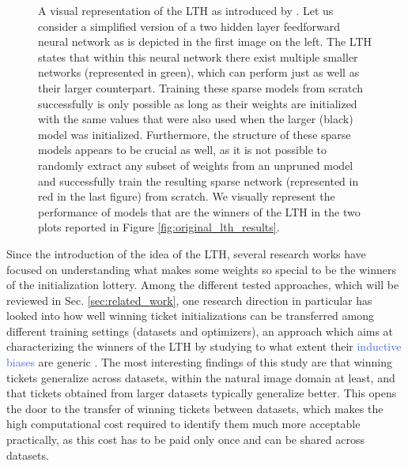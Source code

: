 \begin{figure}[!htb]
\endminipage
\caption{A visual representation of the LTH as introduced by \citet{frankle2018lottery}. Let us consider a simplified version of a two hidden layer feedforward neural network as is depicted in the first image on the left. The LTH states that within this neural network there exist multiple smaller networks (represented in green), which can perform just as well as their larger counterpart. Training these sparse models from scratch successfully is only possible as long as their weights are initialized with the same values that were also used when the larger (black) model was initialized. Furthermore, the structure of these sparse models appears to be crucial as well, as it is not possible to randomly extract any subset of weights from an unpruned model and successfully train the resulting sparse network (represented in red in the last figure) from scratch. We visually represent the performance of models that are the winners of the LTH in the two plots reported in Figure \ref{fig:original_lth_results}.}	
\label{fig:tickets_visualization}
\end{figure}



Since the introduction of the idea of the LTH, several research works have focused on understanding what makes some weights so special to be the winners of the initialization lottery. Among the different tested approaches, which will be reviewed in Sec. \ref{sec:related_work}, one research direction in particular has looked into how well winning ticket initializations can be transferred among different training settings (datasets and optimizers), an approach which aims at characterizing the winners of the LTH by studying to what extent their \textcolor{RoyalBlue}{inductive biases} are generic \cite{morcos2019one}. The most interesting findings of this study are that winning tickets generalize across datasets, within the natural image domain at least, and that tickets obtained from larger datasets typically generalize better. This opens the door to the transfer of winning tickets between datasets, which makes the high computational cost required to identify them much more acceptable practically, as this cost has to be paid only once and can be shared across datasets.

